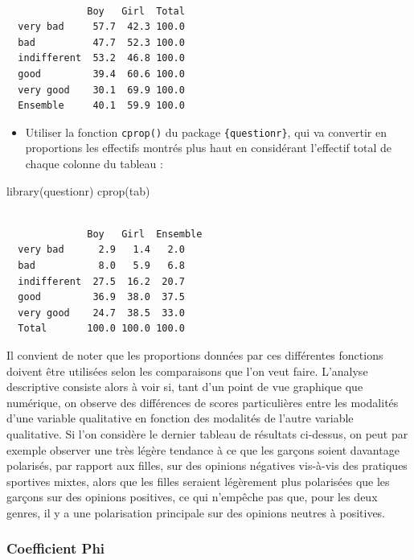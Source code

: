 \documentclass[
  letterpaper,
]{book}
\newenvironment{Shaded}{\begin{snugshade}}{\end{snugshade}}
\newcommand{\FunctionTok}[1]{\textcolor[rgb]{0.28,0.35,0.67}{#1}}
\newcommand{\NormalTok}[1]{\textcolor[rgb]{0.00,0.23,0.31}{#1}}
\providecommand{\tightlist}{%
  \setlength{\itemsep}{0pt}\setlength{\parskip}{0pt}}\usepackage{longtable,booktabs,array}
\begin{document}
\begin{verbatim}
             
              Boy   Girl  Total
  very bad     57.7  42.3 100.0
  bad          47.7  52.3 100.0
  indifferent  53.2  46.8 100.0
  good         39.4  60.6 100.0
  very good    30.1  69.9 100.0
  Ensemble     40.1  59.9 100.0
\end{verbatim}

\begin{itemize}
\tightlist
\item
  Utiliser la fonction \texttt{cprop()} du package
  \texttt{\{questionr\}}, qui va convertir en proportions les effectifs
  montrés plus haut en considérant l'effectif total de chaque colonne du
  tableau :
\end{itemize}

\begin{Shaded}
\begin{Highlighting}[]
\FunctionTok{library}\NormalTok{(questionr)}
\FunctionTok{cprop}\NormalTok{(tab)}
\end{Highlighting}
\end{Shaded}

\begin{verbatim}
             
              Boy   Girl  Ensemble
  very bad      2.9   1.4   2.0   
  bad           8.0   5.9   6.8   
  indifferent  27.5  16.2  20.7   
  good         36.9  38.0  37.5   
  very good    24.7  38.5  33.0   
  Total       100.0 100.0 100.0   
\end{verbatim}

Il convient de noter que les proportions données par ces différentes
fonctions doivent être utilisées selon les comparaisons que l'on veut
faire. L'analyse descriptive consiste alors à voir si, tant d'un point
de vue graphique que numérique, on observe des différences de scores
particulières entre les modalités d'une variable qualitative en fonction
des modalités de l'autre variable qualitative. Si l'on considère le
dernier tableau de résultats ci-dessus, on peut par exemple observer une
très légère tendance à ce que les garçons soient davantage polarisés,
par rapport aux filles, sur des opinions négatives vis-à-vis des
pratiques sportives mixtes, alors que les filles seraient légèrement
plus polarisées que les garçons sur des opinions positives, ce qui
n'empêche pas que, pour les deux genres, il y a une polarisation
principale sur des opinions neutres à positives.

\subsubsection{Coefficient Phi}\label{coefficient-phi}
\end{document}
